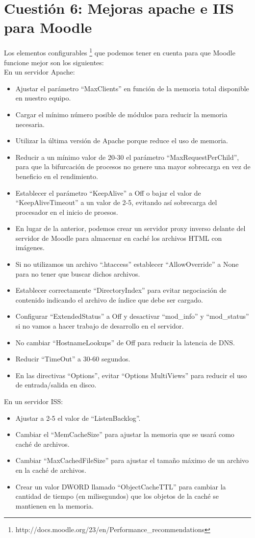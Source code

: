 	\section{Cuestión 6: Mejoras apache e IIS para Moodle}
	Los elementos configurables \footnote{http://docs.moodle.org/23/en/Performance\_recommendations}
 que podemos tener en cuenta para que Moodle funcione mejor son los siguientes:
 \\
 
	
	En un servidor Apache:
	\begin{itemize}
	\item Ajustar el parámetro “MaxClients” en función de la memoria total disponible en nuestro equipo.
	\item Cargar el mínimo número posible de módulos para reducir la memoria necesaria.
	\item Utilizar la última versión de Apache porque reduce el uso de memoria.
	\item Reducir a un mínimo valor de 20-30 el parámetro “MaxRequestPerChild”, para que la bifurcación de procesos no genere una mayor sobrecarga en vez de beneficio en el rendimiento.
	\item Establecer el parámetro “KeepAlive” a Off o bajar el valor de “KeepAliveTimeout” a un valor de 2-5, evitando así sobrecarga del procesador en el inicio de proesos.
	\item En lugar de la anterior, podemos crear un servidor proxy inverso delante del servidor de Moodle para almacenar en caché los archivos HTML con imágenes.
	\item Si no utilizamos un archivo “.htaccess” establecer “AllowOverride” a None para no tener que buscar dichos archivos.
	\item Establecer correctamente “DirectoryIndex” para evitar negociación de contenido indicando el archivo de índice que debe ser cargado.
	\item Configurar “ExtendedStatus” a Off y desactivar “mod\_info” y “mod\_status” si no vamos a hacer trabajo de desarrollo en el servidor.
	\item No cambiar “HostnameLookups” de Off para reducir la latencia de DNS.
	\item Reducir “TimeOut” a 30-60 segundos.
	\item En las directivas “Options”, evitar “Options MultiViews” para reducir el uso de entrada/salida en disco.
	\end{itemize}
	
	En un servidor ISS:
	\begin{itemize}
	\item Ajustar a 2-5 el valor de “ListenBacklog”.
	\item Cambiar el “MemCacheSize” para ajustar la memoria que se usará como caché de archivos.
	\item Cambiar “MaxCachedFileSize” para ajustar el tamaño máximo de un archivo en la caché de archivos.
	\item Crear un valor DWORD llamado “ObjectCacheTTL” para cambiar la cantidad de tiempo (en milisegundos) que los objetos de la caché se mantienen en la memoria.
	\end{itemize}
	
